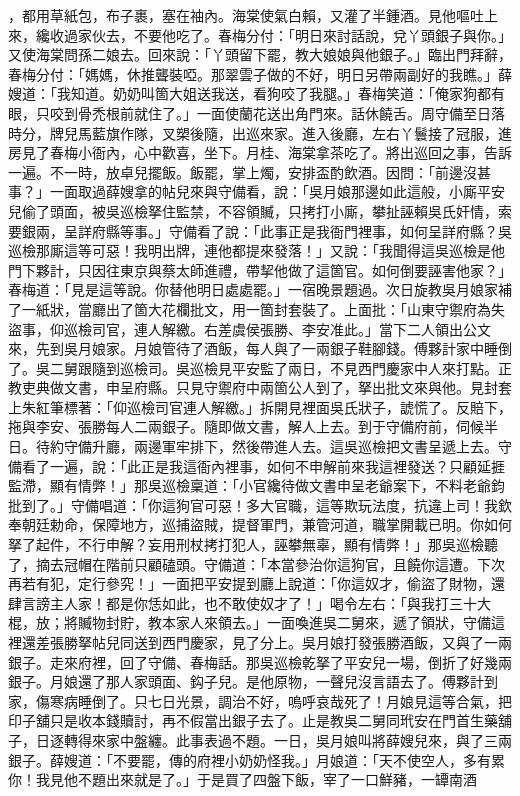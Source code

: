 ，都用草紙包，布子裹，塞在袖內。海棠使氣白賴，又灌了半鍾酒。見他嘔吐上來，纔收過家伙去，不要他吃了。春梅分付：「明日來討話說，兌丫頭銀子與你。」又使海棠問孫二娘去。回來說：「丫頭留下罷，教大娘娘與他銀子。」臨出門拜辭，春梅分付：「媽媽，休推聾裝啞。那翠雲子做的不好，明日另帶兩副好的我瞧。」薛嫂道：「我知道。奶奶叫箇大姐送我送，看狗咬了我腿。」春梅笑道：「俺家狗都有眼，只咬到骨禿根前就住了。」一面使蘭花送出角門來。話休饒舌。周守備至日落時分，牌兒馬藍旗作隊，叉槊後隨，出巡來家。進入後廳，左右丫鬟接了冠服，進房見了春梅小衙內，心中歡喜，坐下。月桂、海棠拿茶吃了。將出巡回之事，告訴一遍。不一時，放卓兒擺飯。飯罷，掌上燭，安排盃酌飲酒。因問：「前邊沒甚事？」一面取過薛嫂拿的帖兒來與守備看，說：「吳月娘那邊如此這般，小廝平安兒偷了頭面，被吳巡檢拏住監禁，不容領贓，只拷打小廝，攀扯誣賴吳氏奸情，索要銀兩，呈詳府縣等事。」守備看了說：「此事正是我衙門裡事，如何呈詳府縣？吳巡檢那廝這等可惡！我明出牌，連他都提來發落！」又說：「我聞得這吳巡檢是他門下夥計，只因往東京與蔡太師進禮，帶挈他做了這箇官。如何倒要誣害他家？」春梅道：「見是這等說。你替他明日處處罷。」一宿晚景題過。次日旋教吳月娘家補了一紙狀，當廳出了箇大花欄批文，用一箇封套裝了。上面批：「山東守禦府為失盜事，仰巡檢司官，連人解繳。右差虞侯張勝、李安准此。」當下二人領出公文來，先到吳月娘家。月娘管待了酒飯，每人與了一兩銀子鞋腳錢。傅夥計家中睡倒了。吳二舅跟隨到巡檢司。吳巡檢見平安監了兩日，不見西門慶家中人來打點。正教吏典做文書，申呈府縣。只見守禦府中兩箇公人到了，拏出批文來與他。見封套上朱紅筆標著：「仰巡檢司官連人解繳。」拆開見裡面吳氏狀子，諕慌了。反賠下，拖與李安、張勝每人二兩銀子。隨即做文書，解人上去。到于守備府前，伺候半日。待約守備升廳，兩邊軍牢排下，然後帶進人去。這吳巡檢把文書呈遞上去。守備看了一遍，說：「此正是我這衙內裡事，如何不申解前來我這裡發送？只顧延捱監滯，顯有情弊！」那吳巡檢稟道：「小官纔待做文書申呈老爺案下，不料老爺鈞批到了。」守備唱道：「你這狗官可惡！多大官職，這等欺玩法度，抗違上司！我欽奉朝廷勅命，保障地方，巡捕盜賊，提督軍門，兼管河道，職掌開載已明。你如何拏了起件，不行申解？妄用刑杖拷打犯人，誣攀無辜，顯有情弊！」那吳巡檢聽了，摘去冠帽在階前只顧磕頭。守備道：「本當參治你這狗官，且饒你這遭。下次再若有犯，定行參究！」一面把平安提到廳上說道：「你這奴才，偷盜了財物，還肆言謗主人家！都是你恁如此，也不敢使奴才了！」喝令左右：「與我打三十大棍，放；將贓物封貯，教本家人來領去。」一面喚進吳二舅來，遞了領狀，守備這裡還差張勝拏帖兒同送到西門慶家，見了分上。吳月娘打發張勝酒飯，又與了一兩銀子。走來府裡，回了守備、春梅話。那吳巡檢乾拏了平安兒一場，倒折了好幾兩銀子。月娘還了那人家頭面、鈎子兒。是他原物，一聲兒沒言語去了。傅夥計到家，傷寒病睡倒了。只七日光景，調治不好，嗚呼哀哉死了！月娘見這等合氣，把印子舖只是收本錢贖討，再不假當出銀子去了。止是教吳二舅同玳安在門首生藥舖子，日逐轉得來家中盤纏。此事表過不題。一日，吳月娘叫將薛嫂兒來，與了三兩銀子。薛嫂道：「不要罷，傳的府裡小奶奶怪我。」月娘道：「天不使空人，多有累你！我見他不題出來就是了。」于是買了四盤下飯，宰了一口鮮豬，一罈南酒 